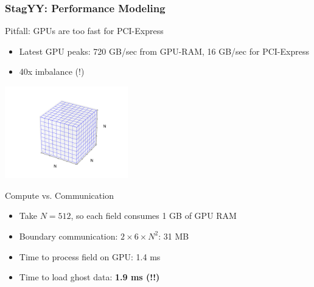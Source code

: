 %
%
\begin{frame}[fragile]
\frametitle{StagYY: Performance Modeling}
  \begin{block}{Pitfall: GPUs are too fast for PCI-Express}
  \begin{itemize}
   \item Latest GPU peaks: 720 GB/sec from GPU-RAM, 16 GB/sec for PCI-Express
   \item 40x imbalance (!)
  \end{itemize}
  \end{block}

  \begin{center} \vspace*{-0.8cm}
    \includegraphics[width=0.4\textwidth]{figures/cube-discretization.pdf}
  \end{center}

  \vspace*{-1.0cm}
   \begin{block}{Compute vs. Communication}
  \begin{itemize}
   \item Take $N=512$, so each field consumes 1 GB of GPU RAM
   \item Boundary communication: $2 \times 6 \times N^2$: 31 MB
   \item Time to process field on GPU: 1.4 ms
   \item Time to load ghost data: \textbf{1.9 ms (!!)}
  \end{itemize}
  \end{block}

\end{frame}
